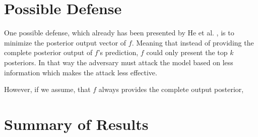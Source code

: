     \section{Possible Defense}
        One possible defense, which already has been presented by He et al. \cite{DBLP:journals/corr/abs-2005-02131}, is to minimize the posterior output vector of $f$. 
        Meaning that instead of providing the complete posterior output of $f$'s prediction, $f$ could only present the top $k$ posteriors.
        In that way the adversary must attack the model based on less information which makes the attack less effective.
        
        However, if we assume, that $f$ always provides the complete output posterior, 

    \section{Summary of Results}
